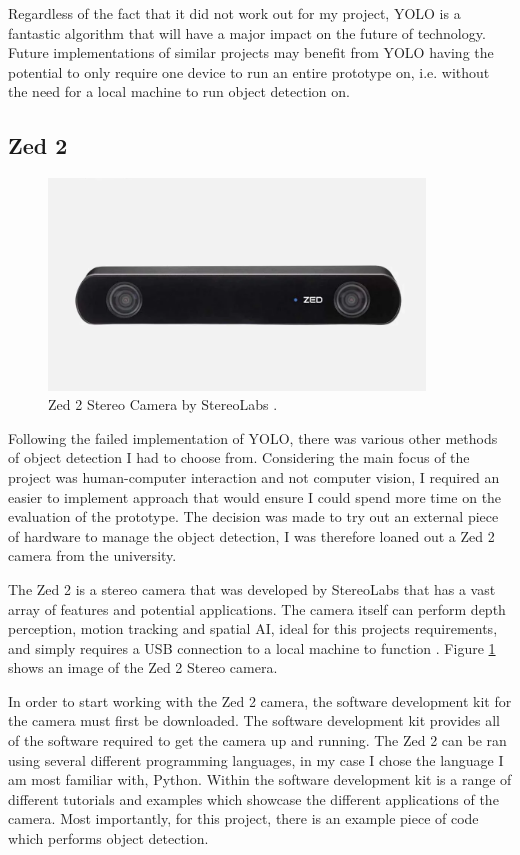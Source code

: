 \documentclass{l4proj}
\begin{document}
Regardless of the fact that it did not work out for my project, YOLO is a fantastic algorithm that will have a major impact on the future of technology. Future implementations of similar projects may benefit from YOLO having the potential to only require one device to run an entire prototype on, i.e. without the need for a local machine to run object detection on.

\subsection{Zed 2}

\begin{figure}[H]
    \centering
    \includegraphics[width=10cm]{images/zed.png}
    \caption{Zed 2 Stereo Camera by StereoLabs \citep{zed_image}.}
    \label{fig:zed}
\end{figure}

Following the failed implementation of YOLO, there was various other methods of object detection I had to choose from. Considering the main focus of the project was human-computer interaction and not computer vision, I required an easier to implement approach that would ensure I could spend more time on the evaluation of the prototype. The decision was made to try out an external piece of hardware to manage the object detection, I was therefore loaned out a Zed 2 camera from the university.

The Zed 2 is a stereo camera that was developed by StereoLabs that has a vast array of features and potential applications. The camera itself can perform depth perception, motion tracking and spatial AI, ideal for this projects requirements, and simply requires a USB connection to a local machine to function \citep{zed_image}. Figure \ref{fig:zed} shows an image of the Zed 2 Stereo camera.

In order to start working with the Zed 2 camera, the software development kit for the camera must first be downloaded. The software development kit provides all of the software required to get the camera up and running. The Zed 2 can be ran using several different programming languages, in my case I chose the language I am most familiar with, Python. Within the software development kit is a range of different tutorials and examples which showcase the different applications of the camera. Most importantly, for this project, there is an example piece of code which performs object detection.
\end{document}
